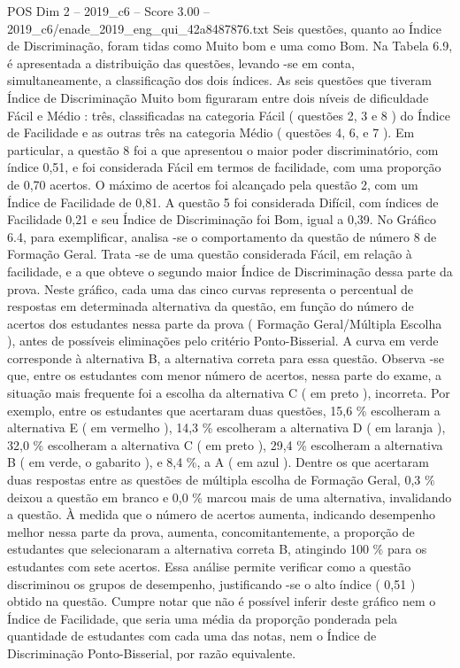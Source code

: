\begin{textsample}{POS Dim 2 – 2019\_c6 – Score 3.00 – 2019\_c6/enade\_2019\_eng\_qui\_42a8487876.txt}
Seis questões, quanto ao Índice de Discriminação, foram tidas como Muito bom e uma como Bom.
Na Tabela 6.9, é apresentada a distribuição das questões, levando -se em conta, simultaneamente, a classificação dos dois índices.
As seis questões que tiveram Índice de Discriminação Muito bom figuraram entre dois níveis de dificuldade Fácil e Médio : três, classificadas na categoria Fácil ( questões 2, 3 e 8 ) do Índice de Facilidade e as outras três na categoria Médio ( questões 4, 6, e 7 ).
Em particular, a questão 8 foi a que apresentou o maior poder discriminatório, com índice 0,51, e foi considerada Fácil em termos de facilidade, com uma proporção de 0,70 acertos.
O máximo de acertos foi alcançado pela questão 2, com um Índice de Facilidade de 0,81.
A questão 5 foi considerada Difícil, com índices de Facilidade 0,21 e seu Índice de Discriminação foi Bom, igual a 0,39.
No Gráfico 6.4, para exemplificar, analisa -se o comportamento da questão de número 8 de Formação Geral.
Trata -se de uma questão considerada Fácil, em relação à facilidade, e a que obteve o segundo maior Índice de Discriminação dessa parte da prova.
Neste gráfico, cada uma das cinco curvas representa o percentual de respostas em determinada alternativa da questão, em função do número de acertos dos estudantes nessa parte da prova ( Formação Geral/Múltipla Escolha ), antes de possíveis eliminações pelo critério Ponto-Bisserial.
A curva em verde corresponde à alternativa B, a alternativa correta para essa questão.
Observa -se que, entre os estudantes com menor número de acertos, nessa parte do exame, a situação mais frequente foi a escolha da alternativa C ( em preto ), incorreta.
Por exemplo, entre os estudantes que acertaram duas questões, 15,6 \% escolheram a alternativa E ( em vermelho ), 14,3 \% escolheram a alternativa D ( em laranja ), 32,0 \% escolheram a alternativa C ( em preto ), 29,4 \% escolheram a alternativa B ( em verde, o gabarito ), e 8,4 \%, a A ( em azul ).
Dentre os que acertaram duas respostas entre as questões de múltipla escolha de Formação Geral, 0,3 \% deixou a questão em branco e 0,0 \% marcou mais de uma alternativa, invalidando a questão.
À medida que o número de acertos aumenta, indicando desempenho melhor nessa parte da prova, aumenta, concomitantemente, a proporção de estudantes que selecionaram a alternativa correta B, atingindo 100 \% para os estudantes com sete acertos.
Essa análise permite verificar como a questão discriminou os grupos de desempenho, justificando -se o alto índice ( 0,51 ) obtido na questão.
Cumpre notar que não é possível inferir deste gráfico nem o Índice de Facilidade, que seria uma média da proporção ponderada pela quantidade de estudantes com cada uma das notas, nem o Índice de Discriminação Ponto-Bisserial, por razão equivalente.

\end{textsample}
